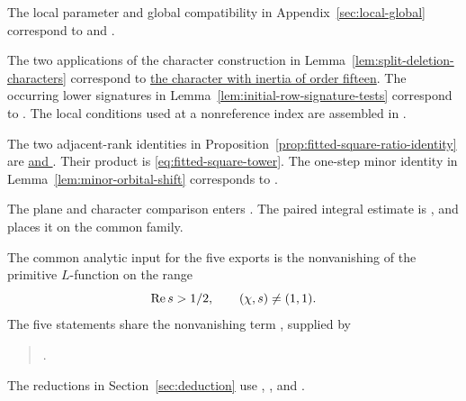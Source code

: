 The local parameter and global compatibility in Appendix~\ref{sec:local-global}
correspond to  and
. \cite{release-local-map-laws}

The two applications of the character construction in
Lemma~\ref{lem:split-deletion-characters} correspond to
\href{https://github.com/Deicyde/riemann-hypothesis/blob/a172c464fd4bcfc4f53e394dcba45d742b1409a6/src/Development/AbelianVarietyTheory/Proofs/IwasawaDecomposition/HostDeltaCharacterInertialOrderFifteenExists.lean\#L76}{the character with inertia of order fifteen}.
The occurring lower signatures in Lemma~\ref{lem:initial-row-signature-tests}
correspond to \href{https://github.com/Deicyde/riemann-hypothesis/blob/a172c464fd4bcfc4f53e394dcba45d742b1409a6/src/Formalism/SharpRestriction/LevelLetterCocycles/BlochKatoPhases.lean\#L100-L116}{}.
The local conditions used at a nonreference index are assembled in
\href{https://github.com/Deicyde/riemann-hypothesis/blob/a172c464fd4bcfc4f53e394dcba45d742b1409a6/src/Development/AutomorphicArithmetic/ThetaCorrespondence/ThetaPairLifts/ThirdPlaceSeries/GaloisInputs.lean\#L19-L29}{}.

The two adjacent-rank identities in Proposition~\ref{prop:fitted-square-ratio-identity}
are \href{https://github.com/Deicyde/riemann-hypothesis/blob/a172c464fd4bcfc4f53e394dcba45d742b1409a6/src/Development/AbelianVarietyTheory/BlockTheory/DivisorBase/WeilTensorModels.lean\#L559-L581}{ and }.
Their product is \eqref{eq:fitted-square-tower}. The one-step minor identity
in Lemma~\ref{lem:minor-orbital-shift} corresponds to
\href{https://github.com/Deicyde/riemann-hypothesis/blob/a172c464fd4bcfc4f53e394dcba45d742b1409a6/src/Development/AbelianVarietyTheory/Proofs/FlagMeasures/LeadingMinorLineUnitAmplitudesLargeGaps.lean\#L359}{}.

The plane and character comparison enters .
The paired integral estimate is , and
 places it on the common family.
\cite{release-joint-record,release-joint-selection}

The common analytic input for the five exports is the nonvanishing
of the primitive \(L\)-function on the range
\[
                \operatorname{Re} s>1/2,\qquad (\chi,s)\ne(1,1).
\]
The five statements share the nonvanishing term , supplied by
\begin{quote}
.
\end{quote}
The reductions in Section~\ref{sec:deduction} use ,
, and . \cite{release}

